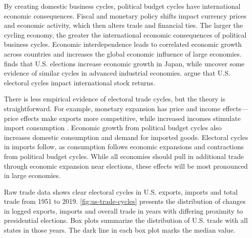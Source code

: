 \documentclass[12pt]{article}
\begin{document}
By creating domestic business cycles, political budget cycles have international economic consequences.
Fiscal and monetary policy shifts impact currency prices and economic activity, which then alters trade and financial ties. 
The larger the cycling economy, the greater the international economic consequences of political business cycles.
Economic interdependence leads to correlated economic growth across countries \citep{ArtisZhang1999, Kayser2006} and increases the global economic influence of large economies. 
\citet{Ito1991} finds that U.S. elections increase economic growth in Japan, while \citet{ThompsonZuk1983} uncover some evidence of similar cycles in advanced industrial economies.
\citet{FoersterSchmitz1997} argue that U.S. electoral cycles impact international stock returns.


There is less empirical evidence of electoral trade cycles, but the theory is straightforward.
For example, monetary expansion has price and income effects--- price effects make exports more competitive, while increased incomes stimulate import consumption \citep{Sumner2021}.
Economic growth from political budget cycles also increases domestic consumption and demand for imported goods. 
Electoral cycles in imports follow, as consumption follows economic expansions and contractions from political budget cycles.  
While all economies should pull in additional trade through economic expansion near elections, these effects will be most pronounced in large economies. 


Raw trade data shows clear electoral cycles in U.S. exports, imports and total trade from 1951 to 2019. 
\autoref{fig:us-trade-cycles} presents the distribution of changes in logged exports, imports and overall trade in years with differing proximity to presidential elections.
Box plots summarize the distribution of U.S. trade with all states in those years. 
The dark line in each box plot marks the median value. 
\end{document}
